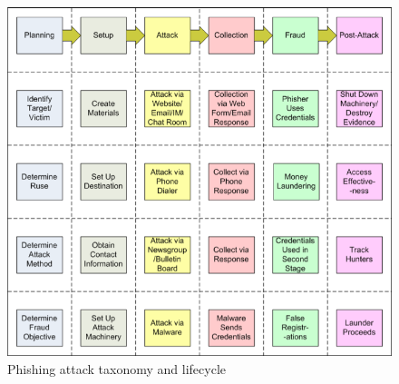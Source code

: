 \begin{figure}
\centering{}\includegraphics[scale=0.4]{gfx/wetzel}\protect\caption{\label{fig:wetzel}Phishing attack taxonomy and lifecycle\citep{wetzel:2005}}
\end{figure}


